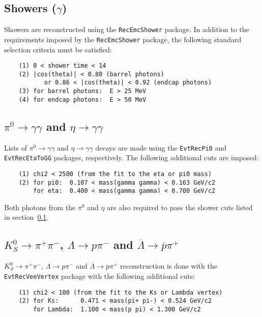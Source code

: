 \documentclass[11pt]{article}
\begin{document}
\subsection[Showers ($\gamma$)]{\boldmath Showers ($\gamma$)}
\label{sec:showers}

Showers are reconstructed using the {\tt RecEmcShower} package.  In addition to the requirements imposed by the {\tt RecEmcShower} package, the following standard selection criteria must be satisfied:
\begin{verbatim}
    (1) 0 < shower time < 14
    (2) |cos(theta)| < 0.80 (barrel photons) 
           or 0.86 < |cos(theta)| < 0.92 (endcap photons)
    (3) for barrel photons:  E > 25 MeV
    (4) for endcap photons:  E > 50 MeV
\end{verbatim}

\subsection[$\pi^0\to\gamma\gamma$ and $\eta\to\gamma\gamma$]{\boldmath $\pi^0\to\gamma\gamma$ and $\eta\to\gamma\gamma$}

Lists of $\pi^0\to\gamma\gamma$ and $\eta\to\gamma\gamma$ decays are made using the {\tt EvtRecPi0} and  {\tt EvtRecEtaToGG} packages, respectively.  The following additional cuts are imposed:
\begin{verbatim}
    (1) chi2 < 2500 (from the fit to the eta or pi0 mass)
    (2) for pi0:  0.107 < mass(gamma gamma) < 0.163 GeV/c2
        for eta:  0.400 < mass(gamma gamma) < 0.700 GeV/c2
\end{verbatim}
Both photons from the $\pi^0$ and $\eta$ are also required to pass the shower cuts listed in section~\ref{sec:showers}.


\subsection[$K^0_S \to \pi^+\pi^-$, $\Lambda \to p\pi^-$ and $\overline{\Lambda}\to\overline{p}\pi^+$]{\boldmath $K^0_S \to \pi^+\pi^-$, $\Lambda \to p\pi^-$ and $\overline{\Lambda}\to\overline{p}\pi^+$ }

$K^0_S \to \pi^+\pi^-$, $\Lambda \to p\pi^-$ and $\overline{\Lambda}\to\overline{p}\pi^+$ reconstruction is done with the {\tt EvtRecVeeVertex} package with the following additional cuts:
\begin{verbatim}
    (1) chi2 < 100 (from the fit to the Ks or Lambda vertex)
    (2) for Ks:      0.471 < mass(pi+ pi-) < 0.524 GeV/c2
        for Lambda:  1.100 < mass(p pi) < 1.300 GeV/c2
\end{verbatim}
\end{document}
